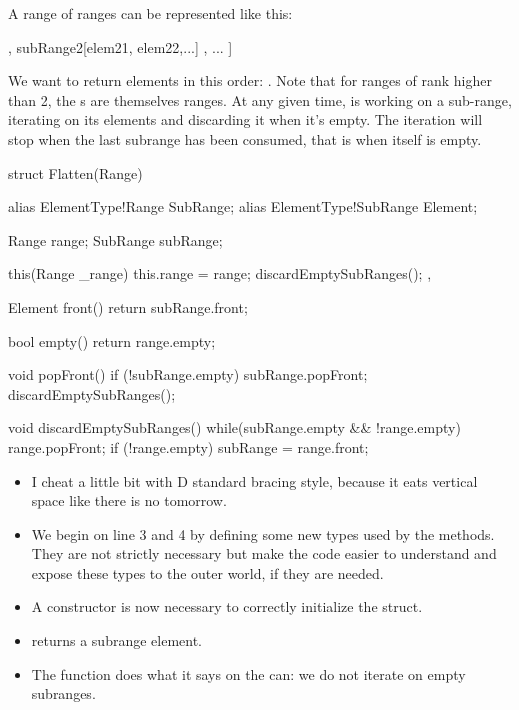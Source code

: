 A range of ranges can be represented like this:

\begin{dcode}
[ subRange1[elem11, elem12,...]
, subRange2[elem21, elem22,...] 
, ... ]
\end{dcode}

We want  to return elements in this order: . Note that for ranges of rank higher than 2, the s are themselves ranges. At any given time,  is working on a sub-range, iterating on its elements and discarding it when it's empty. The iteration will stop when the last subrange has been consumed, that is when  itself is empty.

\begin{ndcode}
struct Flatten(Range)
{
    alias ElementType!Range    SubRange;
    alias ElementType!SubRange Element;

    Range range;
    SubRange subRange;

    this(Range _range) {
        this.range = range;
        discardEmptySubRanges();
    },

    Element front() { return subRange.front;}

    bool empty() { return range.empty;}

    void popFront() {
        if (!subRange.empty) subRange.popFront;
        discardEmptySubRanges();
    }

    void discardEmptySubRanges() {
        while(subRange.empty && !range.empty) {
            range.popFront;
            if (!range.empty) subRange = range.front;
        }
    }
}
\end{ndcode}

\begin{itemize}
\item I cheat a little bit with D standard bracing style, because it eats vertical space like there is no tomorrow.
\item We begin on line 3 and 4 by defining some new types used by the methods. They are not strictly necessary but make the code easier to understand and expose these types to the outer world, if they are needed.
\item A constructor is now necessary to correctly initialize the struct.
\item {} returns a subrange element.
\item The  function does what it says on the can: we do not iterate on empty subranges.
\end{itemize}

